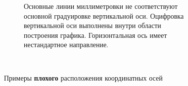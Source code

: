 \begin{figure}
\begin{subfigure}[t]{0.46\tw}
        \caption{Основные линии миллиметровки не соответствуют основной градуировке вертикальной оси. Оцифровка вертикальной оси выполнены внутри области построения графика. Горизонтальная ось имеет нестандартное направление.}
    \end{subfigure}
    \hfill \!\!\!~
    
    \caption{Примеры {\bfseries плохого} расположения координатных осей}
\end{figure}



    
    
    	
    
    
    
    